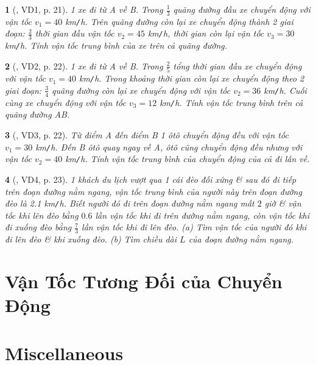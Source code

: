 \documentclass{article}
\newtheorem{baitoan}{}
\begin{document}
\begin{baitoan}[\cite{Van_Quyen_Hanh_Nhu_10_chuyen_Ly}, VD1, p. 21]
	1 xe đi từ A về B. Trong $\frac{1}{3}$ quãng đường đầu xe chuyển động với vận tốc $v_1 = 40$ {\rm km{\tt/}h}. Trên quãng đường còn lại xe chuyển động thành 2 giai đoạn: $\frac{2}{3}$ thời gian đầu vận tốc $v_2 = 45$ {\rm km{\tt/}h}, thời gian còn lại vận tốc $v_3 = 30$ {\rm km{\tt/}h}. Tính vận tốc trung bình của xe trên cả quãng đường.
\end{baitoan}

\begin{baitoan}[\cite{Van_Quyen_Hanh_Nhu_10_chuyen_Ly}, VD2, p. 22]
	1 xe đi từ A về B. Trong $\frac{2}{5}$ tổng thời gian đầu xe chuyển động với vận tốc $v_1 = 40$ {\rm km{\tt/}h}. Trong khoảng thời gian còn lại xe chuyển động theo 2 giai đoạn: $\frac{3}{4}$ quãng đường còn lại xe chuyển động với vận tốc $v_2 = 36$ {\rm km{\tt/}h}. Cuối cùng xe chuyển động với vận tốc $v_3 = 12$ {\rm km{\tt/}h}. Tính vận tốc trung bình trên cả quãng đường AB.
\end{baitoan}

\begin{baitoan}[\cite{Van_Quyen_Hanh_Nhu_10_chuyen_Ly}, VD3, p. 22]
	Từ điểm A đến điểm B 1 ôtô chuyển động đều với vận tốc $v_1 = 30$ {\rm km{\tt/}h}. Đến B ôtô quay ngay về A, ôtô cũng chuyển động đều nhưng với vận tốc $v_2 = 40$ {\rm km{\tt/}h}. Tính vận tốc trung bình của chuyển động của cả đi lẫn về.
\end{baitoan}

\begin{baitoan}[\cite{Van_Quyen_Hanh_Nhu_10_chuyen_Ly}, VD4, p. 23]
	1 khách du lịch vượt qua 1 cái đèo đối xứng \& sau đó đi tiếp trên đoạn đường nằm ngang, vận tốc trung bình của người này trên đoạn đường đèo là {\rm2.1 km{\tt/}h}. Biết người đó đi trên đoạn đường nằm ngang mất $2$ giờ \& vận tốc khi lên đèo bằng $0.6$ lần vận tốc khi đi trên đường nằm ngang, còn vận tốc khi đi xuống đèo bằng $\frac{7}{3}$ lần vận tốc khi đi lên đèo. (a) Tìm vận tốc của người đó khi đi lên đèo \& khi xuống đèo. (b) Tìm chiều dài $L$ của đoạn đường nằm ngang.
\end{baitoan}


\section{Vận Tốc Tương Đối của Chuyển Động}


\section{Miscellaneous}


\printbibliography[heading=bibintoc]
	
\end{document}
